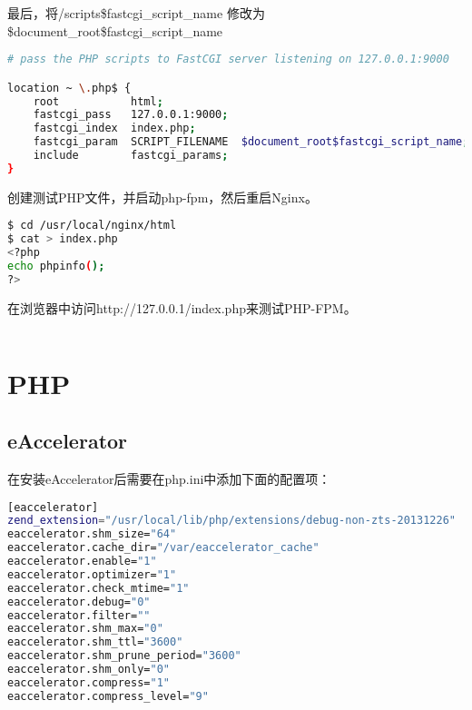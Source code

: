 最后，将/scripts\$fastcgi\_script\_name 修改为 \$document\_root\$fastcgi\_script\_name

\begin{lstlisting}[language=bash]
# pass the PHP scripts to FastCGI server listening on 127.0.0.1:9000

location ~ \.php$ {
    root           html;
    fastcgi_pass   127.0.0.1:9000;
    fastcgi_index  index.php;
    fastcgi_param  SCRIPT_FILENAME  $document_root$fastcgi_script_name;
    include        fastcgi_params;
}
\end{lstlisting}

创建测试PHP文件，并启动php-fpm，然后重启Nginx。


\begin{lstlisting}[language=bash]
$ cd /usr/local/nginx/html
$ cat > index.php
<?php
echo phpinfo();
?>

\end{lstlisting}

在浏览器中访问http://127.0.0.1/index.php来测试PHP-FPM。




\begin{lstlisting}[language=bash]

\end{lstlisting}



\section{PHP}

\subsection{eAccelerator}

在安装eAccelerator后需要在php.ini中添加下面的配置项：

\begin{lstlisting}[language=bash]
[eaccelerator]
zend_extension="/usr/local/lib/php/extensions/debug-non-zts-20131226"
eaccelerator.shm_size="64"
eaccelerator.cache_dir="/var/eaccelerator_cache"
eaccelerator.enable="1"
eaccelerator.optimizer="1"
eaccelerator.check_mtime="1"
eaccelerator.debug="0"
eaccelerator.filter=""
eaccelerator.shm_max="0"
eaccelerator.shm_ttl="3600"
eaccelerator.shm_prune_period="3600"
eaccelerator.shm_only="0"
eaccelerator.compress="1"
eaccelerator.compress_level="9"
\end{lstlisting}




